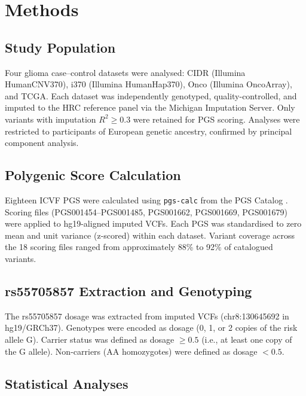 \documentclass[11pt,a4paper]{article}
\begin{document}
\section{Methods}

\subsection{Study Population}

Four glioma case--control datasets were analysed: CIDR (Illumina HumanCNV370), i370 (Illumina HumanHap370), Onco (Illumina OncoArray), and TCGA. Each dataset was independently genotyped, quality-controlled, and imputed to the HRC reference panel via the Michigan Imputation Server. Only variants with imputation $R^2 \geq 0.3$ were retained for PGS scoring. Analyses were restricted to participants of European genetic ancestry, confirmed by principal component analysis.

\subsection{Polygenic Score Calculation}

Eighteen ICVF PGS were calculated using \texttt{pgs-calc} from the PGS Catalog \cite{lambert2021}. Scoring files (PGS001454--PGS001485, PGS001662, PGS001669, PGS001679) were applied to hg19-aligned imputed VCFs. Each PGS was standardised to zero mean and unit variance (z-scored) within each dataset. Variant coverage across the 18 scoring files ranged from approximately 88\% to 92\% of catalogued variants.


\subsection{rs55705857 Extraction and Genotyping}

The rs55705857 dosage was extracted from imputed VCFs (chr8:130645692 in hg19/GRCh37). Genotypes were encoded as dosage (0, 1, or 2 copies of the risk allele G). Carrier status was defined as dosage $\geq 0.5$ (i.e., at least one copy of the G allele). Non-carriers (AA homozygotes) were defined as dosage $< 0.5$.

\subsection{Statistical Analyses}
\end{document}

